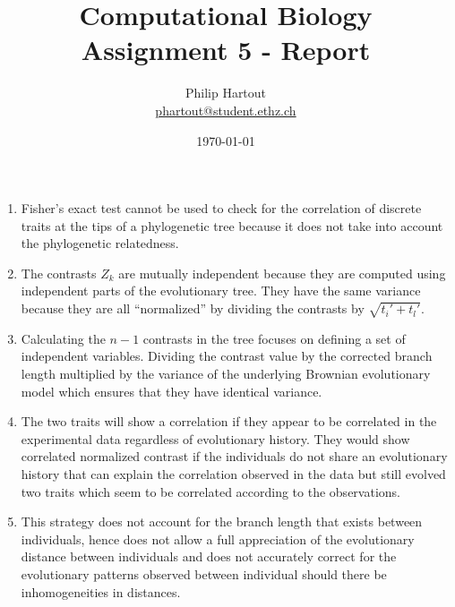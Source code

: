 \documentclass[a4paper,10pt,twoside]{article}
\title{Computational Biology \\ Assignment 5 - Report}
\author{Philip Hartout \\ \url{phartout@student.ethz.ch}}
\date{\today}
\begin{document}
\maketitle

\begin{enumerate}
    \item Fisher's exact test cannot be used to check for the correlation of discrete traits at the tips of a phylogenetic tree because it does not take into account the phylogenetic relatedness. 
    \item The contrasts $Z_k$ are mutually independent because they are computed using independent parts of the evolutionary tree. They have the same variance because they are all ``normalized'' by dividing the contrasts by $\sqrt{t_i'+t_l'}$.
    \item Calculating the $n-1$ contrasts in the tree focuses on defining a set of independent variables. Dividing the contrast value by the corrected branch length multiplied by the variance of the underlying Brownian evolutionary model which ensures that they have identical variance. 
    \item The two traits will show a correlation if they appear to be correlated in the experimental data regardless of evolutionary history. They would show correlated normalized contrast if the individuals do not share an evolutionary history that can explain the correlation observed in the data but still evolved two traits which seem to be correlated according to the observations.
    \item This strategy does not account for the branch length that exists between individuals, hence does not allow a full appreciation of the evolutionary distance between individuals and does not accurately correct for the evolutionary patterns observed between individual should there be inhomogeneities in distances. 
\end{enumerate}
\end{document}
